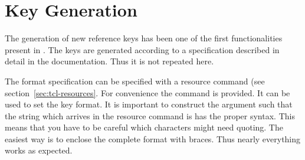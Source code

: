 \section{Key Generation}

The generation of new reference keys has been one of the first
functionalities present in \BibTool. The keys are generated according
to a specification described in detail in the \BibTool{}
documentation. Thus it is not repeated here.

The format specification can be specified with a resource command (see
section~\ref{sec:tcl-resources}. For convenience the command
 is provided. It can be used to set the key
format. It is important to construct the argument such that the string
which arrives in the resource command is has the proper syntax. This
means that you have to be careful which characters might need
quoting. The easiest way is to enclose the complete format with
braces. Thus nearly everything works as expected.

